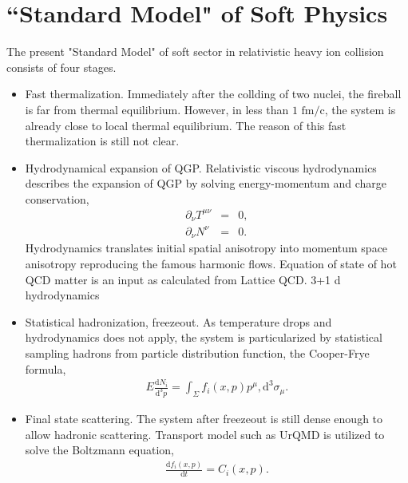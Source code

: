 \documentclass[aps,prl,twocolumn,groupedaddress]{revtex4-1}
\begin{document}
\section{``Standard Model" of Soft Physics}
	The present "Standard Model" of soft sector in relativistic heavy ion collision consists of four stages.
	\begin{itemize}
		\item Fast thermalization. 
		Immediately after the collding of two nuclei, the fireball is far from thermal equilibrium. However, in less than $1 \textrm{ fm/c}$, the system is already close to local thermal equilibrium. 
		The reason of this fast thermalization is still not clear.
		\item Hydrodynamical expansion of QGP. 
		Relativistic viscous hydrodynamics describes the expansion of QGP by solving energy-momentum and charge conservation,
		\begin{eqnarray}
			\partial_\nu T^{\mu\nu} &=& 0, \\
			\partial_\nu N^{\nu} &=& 0. 
		\end{eqnarray}
		Hydrodynamics translates initial spatial anisotropy into momentum space anisotropy reproducing the famous harmonic flows. 
		Equation of state of hot QCD matter is an input as calculated from Lattice QCD.
		3+1 d hydrodynamics \cite{Iurii:2014vhlle}

		\item Statistical hadronization, freezeout. 
		As temperature drops and hydrodynamics does not apply, the system is particularized by statistical sampling hadrons from particle distribution function, the Cooper-Frye formula,
		\begin{eqnarray}
			E\frac{\mathrm{d}N_i}{\mathrm{d}^3p} = \int_\Sigma f_i(x, p)p^\mu,\mathrm{d}^3\sigma_\mu.
		\end{eqnarray}
		\item Final state scattering. 
		The system after freezeout is still dense enough to allow hadronic scattering. 
		Transport model such as UrQMD is utilized to solve the Boltzmann equation,
		\begin{eqnarray}
			\frac{\mathrm{d}f_i(x, p)}{\mathrm{d}t} = C_i(x, p).
		\end{eqnarray}
	\end{itemize}
\end{document}
